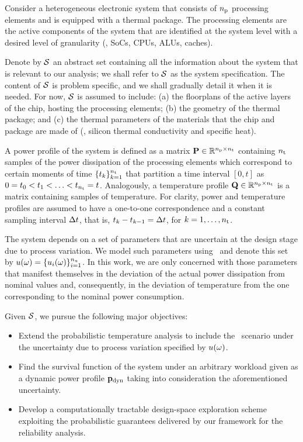 Consider a heterogeneous electronic system that consists of ${n_\text{p}}$ processing elements and is equipped with a thermal package.
The processing elements are the active components of the system that are identified at the system level with a desired level of granularity (\eg, SoCs, CPUs, ALUs, caches).

Denote by $\mathcal{S}$ an abstract set containing all the information about the system that is relevant to our analysis; we shall refer to $\mathcal{S}$ as the system specification.
The content of $\mathcal{S}$ is problem specific, and we shall gradually detail it when it is needed.
For now, $\mathcal{S}$ is assumed to include: (a) the floorplans of the active layers of the chip, hosting the processing elements; (b) the geometry of the thermal package; and (c) the thermal parameters of the materials that the chip and package are made of (\eg, silicon thermal conductivity and specific heat).

A power profile of the system is defined as a matrix $\mathbf{P} \in \mathbb{R}^{{n_\text{p}} \times {n_\text{t}}}$ containing ${n_\text{t}}$ samples of the power dissipation of the processing elements which correspond to certain moments of time $\{ t_k \}_{k = 1}^{n_\text{t}}$ that partition a time interval $[0, t]$ as $0 = t_0 < t_1 < \dotsc < t_{n_\text{t}} = t$.
Analogously, a temperature profile $\mathbf{Q} \in \mathbb{R}^{{n_\text{p}} \times {n_\text{t}}}$ is a matrix containing samples of temperature.
For clarity, power and temperature profiles are assumed to have a one-to-one correspondence and a constant sampling interval $\Delta t$, that is, $t_k - t_{k - 1} = \Delta t$, for $k = 1, \dots, {n_\text{t}}$.

The system depends on a set of parameters that are uncertain at the design stage due to process variation.
We model such parameters using \rvs\ and denote this set by $u(\omega) = \{ u_i(\omega) \}_{i = 1}^{n_\text{u}}$.
In this work, we are only concerned with those parameters that manifest themselves in the deviation of the actual power dissipation from nominal values and, consequently, in the deviation of temperature from the one corresponding to the nominal power consumption.

Given $\mathcal{S}$, we pursue the following major objectives:
\begin{itemize}
  \item Extend the probabilistic temperature analysis to include the \dss\ scenario under the uncertainty due to process variation specified by $u(\omega)$.
  \item Find the survival function of the system under an arbitrary workload given as a dynamic power profile $\mathbf{p}_{\text{dyn}}$ taking into consideration the aforementioned uncertainty.
  \item Develop a computationally tractable design-space exploration scheme exploiting the probabilistic guarantees delivered by our framework for the reliability analysis.
\end{itemize}

